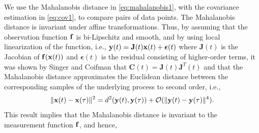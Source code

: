 We use the Mahalanobis distance in \eqref{eq:mahalanobis1}, with the covariance estimation in \eqref{eq:cov1}, to compare pairs of data points. 
%
%
The Mahalanobis distance is invariant under affine transformations.
%
Thus, by assuming that the observation function $\mathbf{f}$ is bi-Lipschitz and smooth, and by using local linearization of the function, i.e., $\mathbf{y}(t) = \mathbf{J}(t) \mathbf{x}(t) + \boldsymbol{\epsilon}(t)$ where $\mathbf{J}(t)$ is the Jacobian of $\mathbf{f}(\mathbf{x}(t))$ and $\boldsymbol{\epsilon}(t)$ is the residual consisting of higher-order terms, it was shown by Singer and Coifman \cite{singer2008non} that $\mathbf{C}(t) = \mathbf{J}(t)\mathbf{J}^T(t)$ and that the Mahalanobis distance approximates the Euclidean distance between the corresponding samples of the underlying process to second order, i.e.,
\begin{equation}
	\| \mathbf{x}(t) - \mathbf{x}(\tau) \|^2 = d^2(\mathbf{y}(t), \mathbf{y}(\tau)) + \mathcal{O}(\| \mathbf{y}(t) - \mathbf{y}(\tau)\|^4).
\end{equation}
%
This result implies that the Mahalanobis distance is invariant to the measurement function $\mathbf{f}$, and hence,
